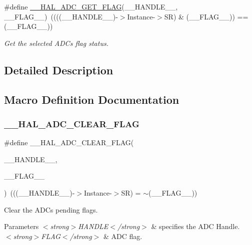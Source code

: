 \begin{DoxyCompactItemize}
\#define \mbox{\hyperlink{group___a_d_c___exported___macros_gaff951862689bb92173f803577cf2d447}{\+\_\+\+\_\+\+H\+A\+L\+\_\+\+A\+D\+C\+\_\+\+G\+E\+T\+\_\+\+F\+L\+AG}}(\+\_\+\+\_\+\+H\+A\+N\+D\+L\+E\+\_\+\+\_\+,  \+\_\+\+\_\+\+F\+L\+A\+G\+\_\+\+\_\+)~((((\+\_\+\+\_\+\+H\+A\+N\+D\+L\+E\+\_\+\+\_\+)-\/$>$Instance-\/$>$SR) \& (\+\_\+\+\_\+\+F\+L\+A\+G\+\_\+\+\_\+)) == (\+\_\+\+\_\+\+F\+L\+A\+G\+\_\+\+\_\+))
\begin{DoxyCompactList}\small\item\em Get the selected A\+DC\textquotesingle{}s flag status. \end{DoxyCompactList}\end{DoxyCompactItemize}


\subsection{Detailed Description}


\subsection{Macro Definition Documentation}
\mbox{\label{group___a_d_c___exported___macros_gafe44e1e66141bca3665bb82981a81a17}} 
\subsubsection{\texorpdfstring{\_\_HAL\_ADC\_CLEAR\_FLAG}{\_\_HAL\_ADC\_CLEAR\_FLAG}}
{\footnotesize\ttfamily \#define \+\_\+\+\_\+\+H\+A\+L\+\_\+\+A\+D\+C\+\_\+\+C\+L\+E\+A\+R\+\_\+\+F\+L\+AG(\begin{DoxyParamCaption}\item[{}]{\+\_\+\+\_\+\+H\+A\+N\+D\+L\+E\+\_\+\+\_\+,  }\item[{}]{\+\_\+\+\_\+\+F\+L\+A\+G\+\_\+\+\_\+ }\end{DoxyParamCaption})~(((\+\_\+\+\_\+\+H\+A\+N\+D\+L\+E\+\_\+\+\_\+)-\/$>$Instance-\/$>$SR) = $\sim$(\+\_\+\+\_\+\+F\+L\+A\+G\+\_\+\+\_\+))}



Clear the A\+DC\textquotesingle{}s pending flags. 


\begin{DoxyParams}{Parameters}
{\em $<$strong$>$\+H\+A\+N\+D\+L\+E$<$/strong$>$} & specifies the A\+DC Handle. \\
\hline
{\em $<$strong$>$\+F\+L\+A\+G$<$/strong$>$} & A\+DC flag. \\
\hline
\end{DoxyParams}

